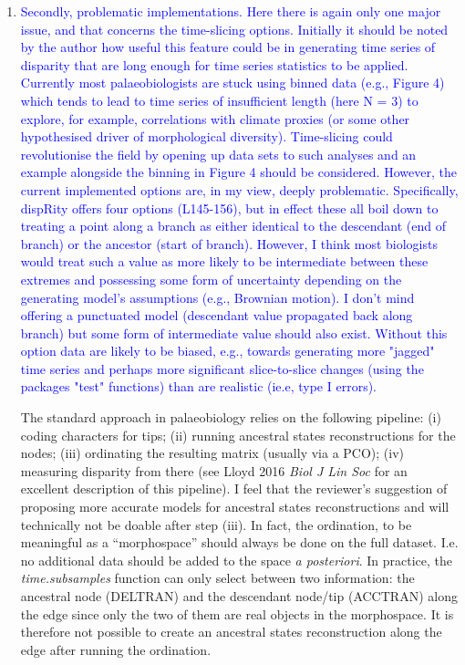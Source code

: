 \documentclass[12pt,letterpaper]{article}
\begin{document}
\begin{enumerate}
\item{\textcolor{blue}{Secondly, problematic implementations.
Here there is again only one major issue, and that concerns the time-slicing options.
Initially it should be noted by the author how useful this feature could be in generating time series of disparity that are long enough for time series statistics to be applied.
Currently most palaeobiologists are stuck using binned data (e.g., Figure 4) which tends to lead to time series of insufficient length (here N = 3) to explore, for example, correlations with climate proxies (or some other hypothesised driver of morphological diversity).
Time-slicing could revolutionise the field by opening up data sets to such analyses and an example alongside the binning in Figure 4 should be considered.
However, the current implemented options are, in my view, deeply problematic.
Specifically, dispRity offers four options (L145-156), but in effect these all boil down to treating a point along a branch as either identical to the descendant (end of branch) or the ancestor (start of branch).
However, I think most biologists would treat such a value as more likely to be intermediate between these extremes and possessing some form of uncertainty depending on the generating model's assumptions (e.g., Brownian motion).
I don't mind offering a punctuated model (descendant value propagated back along branch) but some form of intermediate value should also exist.
Without this option data are likely to be biased, e.g., towards generating more "jagged" time series and perhaps more significant slice-to-slice changes (using the packages "test" functions) than are realistic (ie.e, type I errors).}}

The standard approach in palaeobiology relies on the following pipeline: (i) coding characters for tips; (ii) running ancestral states reconstructions for the nodes; (iii) ordinating the resulting matrix (usually via a PCO); (iv) measuring disparity from there (see Lloyd 2016 \textit{Biol J Lin Soc} for an excellent description of this pipeline).
I feel that the reviewer's suggestion of proposing more accurate models for ancestral states reconstructions and will technically not be doable after step (iii).
In fact, the ordination, to be meaningful as a ``morphospace'' should always be done on the full dataset.
I.e. no additional data should be added to the space \textit{a posteriori}.
In practice, the \textit{time.subsamples} function can only select between two information: the ancestral node (DELTRAN) and the descendant node/tip (ACCTRAN) along the edge since only the two of them are real objects in the morphospace.
It is therefore not possible to create an ancestral states reconstruction along the edge after running the ordination.


\end{enumerate}
\end{document}
